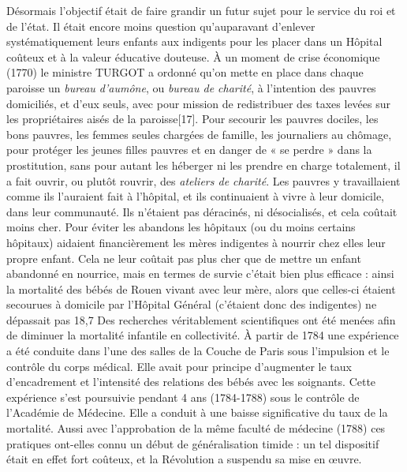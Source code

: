  Désormais l'objectif était de faire grandir un futur sujet pour le service du roi et de l'état. Il était encore moins question qu'auparavant d'enlever systématiquement leurs enfants aux indigents pour les placer dans un Hôpital coûteux et à la valeur éducative douteuse. À un moment de crise économique (1770) le ministre TURGOT a ordonné qu'on mette en place dans chaque paroisse un \emph{bureau d'aumône}, ou \emph{bureau de charité}, à l'intention des pauvres domiciliés, et d'eux seuls, avec pour mission de redistribuer des taxes levées sur les propriétaires aisés de la paroisse[17]. Pour secourir les pauvres dociles, les bons pauvres, les femmes seules chargées de famille, les journaliers au chômage, pour protéger les jeunes filles pauvres et en danger de « se perdre » dans la prostitution, sans pour autant les héberger ni les prendre en charge totalement, il a fait ouvrir, ou plutôt rouvrir, des \emph{ateliers de charité}. Les pauvres y travaillaient comme ils l'auraient fait à l'hôpital, et ils continuaient à vivre à leur domicile, dans leur communauté. Ils n'étaient pas déracinés, ni désocialisés, et cela coûtait moins cher. 
 Pour éviter les abandons les hôpitaux (ou du moins certains hôpitaux) aidaient financièrement les mères indigentes à nourrir chez elles leur propre enfant. Cela ne leur coûtait pas plus cher que de mettre un enfant abandonné en nourrice, mais en termes de survie c'était bien plus efficace : ainsi la mortalité des bébés de Rouen vivant avec leur mère, alors que celles-ci étaient secourues à domicile par l'Hôpital Général (c'étaient donc des indigentes) ne dépassait pas 18,7 %
 Des recherches véritablement scientifiques ont été menées afin de diminuer la mortalité infantile en collectivité. À partir de 1784 une expérience a été conduite dans l'une des salles de la Couche de Paris sous l'impulsion et le contrôle du corps médical. Elle avait pour principe d'augmenter le taux d'encadrement et l'intensité des relations des bébés avec les soignants. Cette expérience s'est poursuivie pendant 4 ans (1784-1788) sous le contrôle de l'Académie de Médecine. Elle a conduit à une baisse significative du taux de la mortalité. Aussi avec l'approbation de la même faculté de médecine (1788) ces pratiques ont-elles connu un début de généralisation timide : un tel dispositif était en effet fort coûteux, et la Révolution a suspendu sa mise en œuvre.
